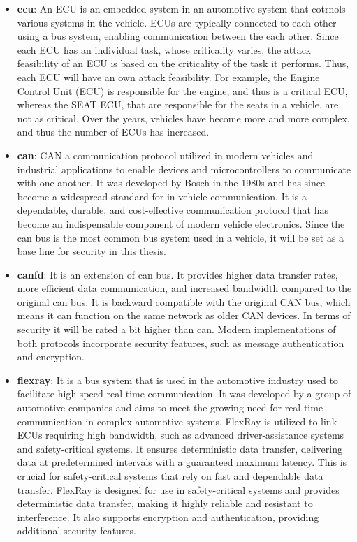 \begin{itemize}
    \item \textbf{\gls{ecu}}: An ECU is an embedded system in an automotive system that cotrnols various systems in the vehicle.
    ECUs are typically connected to each other using a bus system, enabling communication between the each other.
    Since each ECU has an individual task, whose criticality varies, the attack feasibility of an ECU is based on the criticality of the task it performs.
    Thus, each ECU will have an own attack feasibility. 
    For example, the Engine Control Unit (ECU) is responsible for the engine, and thus is a critical ECU, 
    whereas the SEAT ECU, that are responsible for the seats in a vehicle, are not as critical.
    Over the years, vehicles have become more and more complex, and thus the number of ECUs has increased.
    
    \item \textbf{\gls{can}}: CAN a communication protocol utilized in modern vehicles and industrial applications 
    to enable devices and microcontrollers to communicate with one another. 
    It was developed by Bosch in the 1980s and has since become a widespread standard for in-vehicle communication.
    It is a dependable, durable, and cost-effective communication protocol that has become an indispensable component of modern vehicle electronics.
    Since the \gls{can} bus is the most common bus system used in a vehicle, it will be set as a base line for security in this thesis.

    \item \textbf{\gls{canfd}}: It is an extension of \gls{can} bus.
    It provides higher data transfer rates, more efficient data communication, and increased bandwidth compared to the original \gls{can} bus.
    It is backward compatible with the original CAN bus, which means it can function on the same network as older CAN devices.
    In terms of security it will be rated a bit higher than \gls{can}.
    Modern implementations of both protocols incorporate security features, such as message authentication and encryption.
    
    \item \textbf{\gls{flexray}}: It is a bus system that is used in the automotive industry used to facilitate high-speed real-time communication.
    It was developed by a group of automotive companies and aims to meet the growing need for real-time communication in complex automotive systems.
    FlexRay is utilized to link ECUs requiring high bandwidth, such as advanced driver-assistance systems and safety-critical systems. 
    It ensures deterministic data transfer, delivering data at predetermined intervals with a guaranteed maximum latency. 
    This is crucial for safety-critical systems that rely on fast and dependable data transfer.
    FlexRay is designed for use in safety-critical systems and provides deterministic data transfer, making it highly reliable and resistant to interference. 
    It also supports encryption and authentication, providing additional security features.


\end{itemize}
